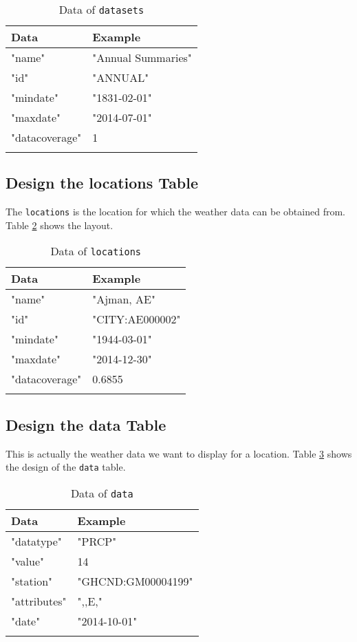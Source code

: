 \documentclass[10pt, a4paper]{article}
\begin{document}
\begin{table}[h]\footnotesize
  \caption{Data of \texttt{datasets}}
  \begin{tabular}{p{5cm} p{7cm}}
    \hline
    \textbf{Data} & \textbf{Example} \\
    \hline
    "name"         & "Annual Summaries" \\
    "id"           & "ANNUAL" \\
    "mindate"      & "1831-02-01" \\
    "maxdate"      & "2014-07-01" \\
    "datacoverage" & 1 \\
    \hline
    \label{tbl:datasetsdata}
  \end{tabular}
\end{table}

\subsection{Design the locations Table}
The \texttt{locations} is the location for which the weather data can be 
obtained from. Table \ref{tbl:locationsdata} shows the layout.

\begin{table}[h]\footnotesize
  \caption{Data of \texttt{locations}}
  \begin{tabular}{p{5cm} p{7cm}}
    \hline
    \textbf{Data} & \textbf{Example} \\
    \hline
    "name"         & "Ajman, AE" \\
    "id"           & "CITY:AE000002" \\
    "mindate"      & "1944-03-01" \\
    "maxdate"      & "2014-12-30" \\
    "datacoverage" & 0.6855 \\
    \hline
    \label{tbl:locationsdata}
  \end{tabular}
\end{table}

\subsection{Design the data Table}
This is actually the weather data we want to display for a location. Table
\ref{tbl:datadata} shows the design of the \texttt{data} table.

\begin{table}[h]\footnotesize
  \caption{Data of \texttt{data}}
  \begin{tabular}{p{5cm} p{7cm}}
    \hline
    \textbf{Data} & \textbf{Example} \\
    \hline
    "datatype"   & "PRCP" \\
    "value"      & 14 \\
    "station"    & "GHCND:GM00004199" \\
    "attributes" & ",,E," \\
    "date"       & "2014-10-01" \\
    \hline
    \label{tbl:datadata}
  \end{tabular}
\end{table}
\end{document}
